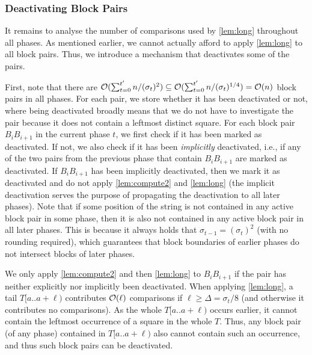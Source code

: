 \subsubsection*{Deactivating Block Pairs}

It remains to analyse the number of comparisons used by \cref{lem:long} throughout all phases. As mentioned earlier, we cannot actually afford to apply \cref{lem:long} to all block pairs. Thus, we introduce a mechanism that deactivates some of the pairs.

First, note that there are $\mathcal{O}(\sum_{t=0}^{t'} n / (\sigma_t)^2) \subseteq \mathcal{O}(\sum_{t=0}^{t'} n / (\sigma_t)^{1/4}) = \mathcal{O}(n)$ block pairs in all phases. For each pair, we store whether it has been deactivated or not, where being deactivated broadly means that we do not have to investigate the pair because it does not contain a leftmost distinct square.
For each block pair $B_iB_{i + 1}$ in the current phase $t$, we first check if it has been marked as deactivated. If not, we also check if it has been \emph{implicitly} deactivated, i.e., if any of the two pairs from the previous phase that contain $B_iB_{i + 1}$ are marked as deactivated. If $B_iB_{i + 1}$ has been implicitly deactivated, then we mark it as deactivated and do not apply \cref{lem:compute2} and \cref{lem:long} (the implicit deactivation serves the purpose of propagating the deactivation to all later phases). Note that if some position of the string is not contained in any active block pair in some phase, then it is also not contained in any active block pair in all later phases. This is because it always holds that $\sigma_{t-1}=(\sigma_{t})^{2}$ (with no rounding required), which guarantees that block boundaries of earlier phases do not intersect blocks of later phases.

We only apply \cref{lem:compute2} and then \cref{lem:long} to $B_iB_{i + 1}$ if the pair has neither explicitly nor implicitly been deactivated. When applying \cref{lem:long}, a tail $T[a..a + \ell)$ contributes $\mathcal{O}(\ell)$ comparisons if $\ell \geq \Delta = \sigma_t / 8$ (and otherwise it contributes no comparisons).
As the whole $T[a..a + \ell)$ occurs earlier,  it cannot contain the leftmost occurrence of a square in the whole $T$. Thus,
any block pair (of any phase) contained in $T[a..a + \ell)$ also cannot contain such an occurrence, and thus such block pairs
can be deactivated.

